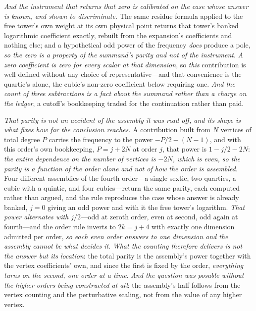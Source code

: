 \documentclass[11pt,a4paper]{article}
\theoremstyle{plain}
\theoremstyle{definition}
\theoremstyle{remark}
\begin{document}
\emph{And the instrument that returns that zero is calibrated on the case whose answer is known, and shown to
discriminate.} The same residue formula applied to the free tower's own weight at its own physical point returns
that tower's banked logarithmic coefficient exactly, rebuilt from the expansion's coefficients and nothing else;
and a hypothetical odd power of the frequency \emph{does} produce a pole, \emph{so the zero is a property of the
summand's parity and not of the instrument}. \emph{A zero coefficient is zero for every scalar at that
dimension}, so \emph{this} contribution is well defined without any choice of representative---and that
convenience is the quartic's alone, the cubic's non-zero coefficient below requiring one. \emph{And the count of three
subtractions is a fact about the summand rather than a charge on the ledger}, a cutoff's bookkeeping traded for
the continuation rather than
paid.

\emph{That parity is not an accident of the assembly it was read off, and its shape is what fixes how far the
conclusion reaches.} A contribution built from $N$ vertices of total degree $P$ carries the frequency to the power
$-P/2-(N-1)$, and with this order's own bookkeeping, $P=j+2N$ at order $j$, that power is $1-j/2-2N$:
\emph{the entire dependence on the number of vertices is $-2N$, which is even, so the parity is a function of the
order alone and not of how the order is assembled}. Four different assemblies of the fourth order---a single
sextic, two quartics, a cubic with a quintic, and four cubics---return the same parity, each computed rather than
argued, and the rule reproduces the case whose answer is already banked, $j=0$ giving an odd power and with it the
free tower's logarithm. \emph{That power alternates with $j/2$}---odd at zeroth order, even at second, odd again at
fourth---and the order rule inverts to $2k=j+4$ with exactly one dimension admitted per order, \emph{so each even
order answers to one dimension and the assembly cannot be what decides it}. \emph{What the counting therefore
delivers is not the answer but its location}: the total parity is the assembly's power together with the vertex
coefficients' own, and since the first is fixed by the order, \emph{everything turns on the second, one order at a
time}. \emph{And the question was posable without the higher orders being constructed at all}: the assembly's
half follows from the vertex counting and the perturbative scaling, not from the value of any higher
vertex.
\end{document}
